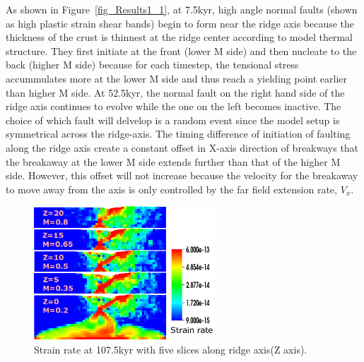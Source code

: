 As shown in Figure~\ref{fig_Results1_1}, at 7.5kyr, high angle normal faults (shown as high plastic strain shear bands) begin to form near the ridge axis because the thickness of the crust is thinnest at the ridge center according to model thermal structure. They first initiate at the front (lower M side) and then nucleate to the back (higher M side) because for each timestep, the tensional stress accummulates more at the lower M side and thus reach a yielding point earlier than higher M side. At 52.5kyr, the normal fault on the right hand side of the ridge axis continues to evolve while the one on the left becomes inactive. The choice of which fault will delvelop is a random event since the model setup is symmetrical across the ridge-axis. The timing difference of initiation of faulting along the ridge axis create a constant offset in X-axis direction of breakways that the breakaway at the lower M side extends further than that of the higher M side. However, this offset will not increase because the velocity for the breakaway to move away from the axis is only controlled by the far field extension rate, $V_{x}$.

\begin{figure}[H]
  \centering
    \includegraphics[width=0.6\textwidth]{fig_Results1_2.eps}
  \caption{Strain rate at 107.5kyr with five slices along ridge axis(Z axis).}
 \label{fig_Results1_2}
\end{figure}   

